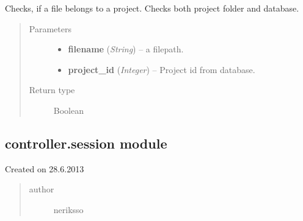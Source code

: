 \documentclass[letterpaper,10pt,english]{sphinxmanual}
\begin{document}
\begin{fulllineitems}
\label{controller:controller.project.is_project_file}
Checks, if a file belongs to a project. Checks both project folder
and database.
\begin{quote}\begin{description}
\item[{Parameters}] \leavevmode\begin{itemize}
\item {} 
\textbf{filename} (\emph{String}) -- a filepath.

\item {} 
\textbf{project\_id} (\emph{Integer}) -- Project id from database.

\end{itemize}

\item[{Return type}] \leavevmode
Boolean

\end{description}\end{quote}

\end{fulllineitems}



\subsection{controller.session module}
\label{controller:module-controller.session}\label{controller:controller-session-module}
Created on 28.6.2013
\begin{quote}\begin{description}
\item[{author}] \leavevmode
neriksso

\end{description}\end{quote}
\end{document}

